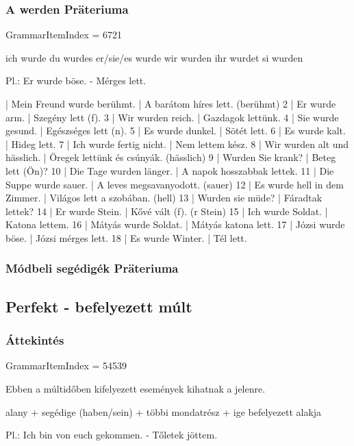 \documentclass{article}
\newenvironment{desc}{\verbatim}{\endverbatim}
\newenvironment{exmp}{\verbatim}{\endverbatim}
\begin{document}
\subsubsection{A werden Präteriuma}

GrammarItemIndex = 6721

\begin{desc}
ich wurde
du wurdes
er/sie/es wurde
wir wurden
ihr wurdet
si wurden

Pl.: Er wurde böse. - Mérges lett.
\end{desc}

\begin{exmp}
1 | Mein Freund wurde berühmt. | A barátom híres lett. (berühmt)
2 | Er wurde arm. | Szegény lett (f).
3 | Wir wurden reich. | Gazdagok lettünk.
4 | Sie wurde gesund. | Egészséges lett (n).
5 | Es wurde dunkel. | Sötét lett.
6 | Es wurde kalt. | Hideg lett.
7 | Ich wurde fertig nicht. | Nem lettem kész.
8 | Wir wurden alt und hässlich. | Öregek lettünk és csúnyák. (hässlich)
9 | Wurden Sie krank? | Beteg lett (Ön)?
10 | Die Tage wurden länger. | A napok hosszabbak lettek.
11 | Die Suppe wurde sauer. | A leves megsavanyodott. (sauer)
12 | Es wurde hell in dem Zimmer. | Világos lett a szobában. (hell)
13 | Wurden sie müde? | Fáradtak lettek?
14 | Er wurde Stein. | Kővé vált (f). (r Stein)
15 | Ich wurde Soldat. | Katona lettem.
16 | Mátyás wurde Soldat. | Mátyás katona lett.
17 | Józsi wurde böse. | Józsi mérges lett.
18 | Es wurde Winter. | Tél lett.
\end{exmp}

\subsubsection{Módbeli segédigék Präteriuma}

\subsection{Perfekt - befelyezett múlt}

\subsubsection{Áttekintés}

GrammarItemIndex = 54539

\begin{desc}
Ebben a múltidőben kifelyezett események kihatnak a jelenre.
\begin{center}
alany + segédige (haben/sein) + többi mondatrész + ige befelyezett alakja
\end{center}

Pl.: Ich bin von euch gekommen. - Tőletek jöttem.
\end{desc}
\end{document}
